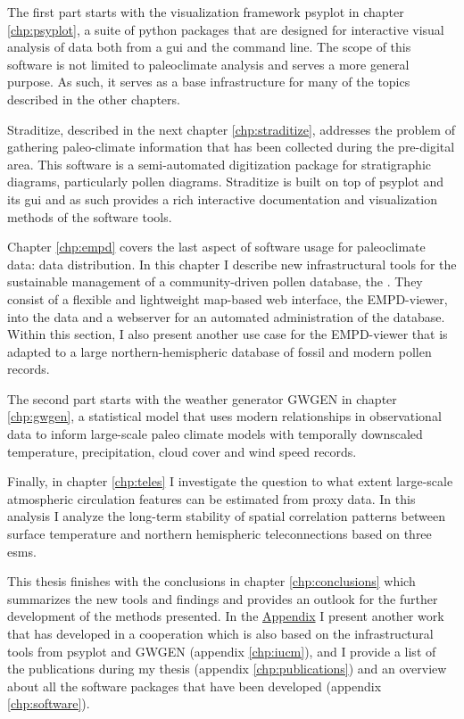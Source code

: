 \begin{refsection}
The first part starts with the visualization framework psyplot in chapter \ref{chp:psyplot}, a suite of python packages that are designed for interactive visual analysis of data both from a \gls{gui} and the command line. The scope of this software is not limited to paleoclimate analysis and serves a more general purpose. As such, it serves as a base infrastructure for many of the topics described in the other chapters.

Straditize, described in the next chapter \ref{chp:straditize}, addresses the problem of gathering paleo-climate information that has been collected during the pre-digital area. This software is a semi-automated digitization package for stratigraphic diagrams, particularly pollen diagrams. Straditize is built on top of psyplot and its \gls{gui} and as such provides a rich interactive documentation and visualization methods of the software tools.

Chapter \ref{chp:empd} covers the last aspect of software usage for paleoclimate data: data distribution. In this chapter I describe new infrastructural tools for the sustainable management of a community-driven pollen database, the . They consist of a flexible and lightweight map-based web interface, the EMPD-viewer, into the data and a webserver for an automated administration of the database. Within this section, I also present another use case for the EMPD-viewer that is adapted to a large northern-hemispheric database of fossil and modern pollen records.

The second part starts with the weather generator GWGEN in chapter \ref{chp:gwgen}, a statistical model that uses modern relationships in observational data to inform large-scale paleo climate models with temporally downscaled temperature, precipitation, cloud cover and wind speed records.

Finally, in chapter \ref{chp:teles} I investigate the question to what extent large-scale atmospheric circulation features can be estimated from proxy data. In this analysis I analyze the long-term stability of spatial correlation patterns between surface temperature and northern hemispheric teleconnections based on three \glspl{esm}.

This thesis finishes with the conclusions in chapter \ref{chp:conclusions} which summarizes the new tools and findings and provides an outlook for the further development of the methods presented. In the \hyperlink{appendix}{Appendix} I present another work that has developed in a cooperation which is also based on the infrastructural tools from psyplot and GWGEN (appendix \ref{chp:iucm}), and I provide a list of the publications during my thesis (appendix \ref{chp:publications}) and an overview about all the software packages that have been developed (appendix \ref{chp:software}).

\printbibliography[heading=subbibintoc]

\end{refsection}